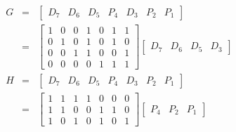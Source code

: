 \documentclass[11pt]{article} %
\theoremstyle{definition}
\begin{document}
\begin{eqnarray*}
G &=& \begin{bmatrix}
	D_7 & D_6 & D_5 & P_4 & D_3 & P_2 & P_1
\end{bmatrix} \\
&=& \begin{bmatrix}
1 & 0 & 0 & 1 & 0 & 1 & 1 \\
0 & 1 & 0 & 1 & 0 & 1 & 0\\
0 & 0 & 1 & 1 & 0 & 0 & 1\\
0 & 0 & 0 & 0 & 1 & 1 & 1
\end{bmatrix} \begin{bmatrix}
 D_7 & D_6 & D_5 & D_3
\end{bmatrix} \\
H &=& \begin{bmatrix}
D_7 & D_6 & D_5 & P_4 & D_3 & P_2 & P_1
\end{bmatrix} \\
&=& \begin{bmatrix}
1 & 1 & 1 & 1 & 0 & 0 & 0\\
1 & 1 & 0 & 0 & 1 & 1 & 0\\
1 & 0 & 1 & 0 & 1 & 0 & 1
\end{bmatrix} \begin{bmatrix} P_4 & P_2 & P_1 \end{bmatrix}
\end{eqnarray*}
\end{document}
